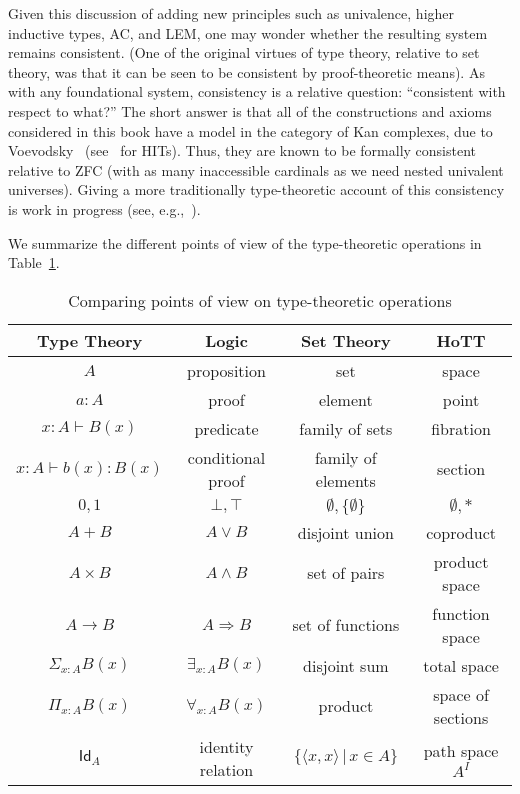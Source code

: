 Given this discussion of adding new principles such as univalence, higher inductive types, AC, and LEM, one may wonder whether the resulting system remains consistent.
(One of the original virtues of type theory, relative to set theory, was that it can be seen to be consistent by proof-theoretic means).
As with any foundational system, consistency is a relative question: ``consistent with respect to what?''
The short answer is that all of the constructions and axioms considered in this book have a model in the category of Kan complexes, due to Voevodsky~\cite{klv:ssetmodel} (see~\cite{ls:hits} for HITs).
Thus, they are known to be formally consistent relative to ZFC (with as many inaccessible cardinals as we need nested univalent universes).
Giving a more traditionally type-theoretic account of this consistency is work in progress (see,
e.g.,~\cite{lh:canonicity,coquand2012constructive}).

We summarize the different points of view of the type-theoretic operations in Table~\ref{tab:pov}.

\begin{table}\centering
  \begin{tabular}{c||c|c|c}
       Type Theory & Logic & Set Theory & HoTT\\\hline
       $A$ & proposition & set & space\\
       $a:A$ & proof & element & point \\
       $x:A \vdash B(x)$ & predicate & family of sets & fibration \\
       $x:A \vdash b(x) : B(x)$ & conditional proof & family of elements & section\\
       $0, 1$ & $\bot, \top$ & $\emptyset, \{ \emptyset \}$ & $\emptyset, *$\\
       $A + B$ & $A\vee B$ & disjoint union & coproduct\\
       $A\times B$ & $A\wedge B$ & set of pairs & product space\\
       $A\to B$ & $A\Rightarrow B$ & set of functions & function space\\
       $\Sigma_{x:A}B(x)$ &  $\exists_{x:A}B(x)$ & disjoint sum & total space\\
       $\Pi_{x:A}B(x)$ &  $\forall_{x:A}B(x)$ & product & space of sections\\
       $\mathsf{Id}_{A}$ & identity relation & $\{\langle x,x\rangle\, |\, x\in A\}$ & path space $A^I$
  \end{tabular}
  \caption{Comparing points of view on type-theoretic operations}\label{tab:pov}
\end{table}


